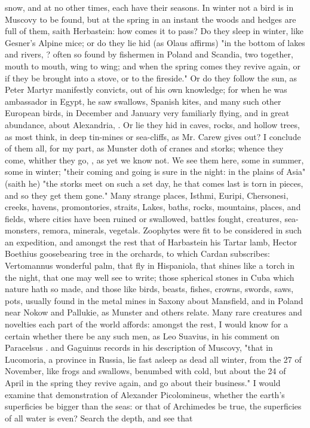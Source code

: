 {snow, and at no other times, each have their seasons. In winter not a bird is in Muscovy to be found, but at the spring in an instant the woods and hedges are full of them, saith Herbastein: how comes it to pass? Do they sleep in winter, like Gesner's Alpine mice; or do they lie hid (as Olaus affirms) "in the bottom of lakes and rivers, ? often so found by fishermen in Poland and Scandia, two together, mouth to mouth, wing to wing; and when the spring comes they revive again, or if they be brought into a stove, or to the fireside." Or do they follow the sun, as Peter Martyr  manifestly convicts, out of his own knowledge; for when he was ambassador in Egypt, he saw swallows, Spanish kites, and many such other European birds, in December and January very familiarly flying, and in great abundance, about Alexandria, . Or lie they hid in caves, rocks, and hollow trees, as most think, in deep tin-mines or sea-cliffs, as Mr. Carew gives out? I conclude of them all, for my part, as Munster doth of cranes and storks; whence they come, whither they go, , as yet we know not. We see them here, some in summer, some in winter; "their coming and going is sure in the night: in the plains of Asia" (saith he) "the storks meet on such a set day, he that comes last is torn in pieces, and so they get them gone." Many strange places, Isthmi, Euripi, Chersonesi, creeks, havens, promontories, straits, Lakes, baths, rocks, mountains, places, and fields, where cities have been ruined or swallowed, battles fought, creatures, sea-monsters, remora, \etc{} minerals, vegetals. Zoophytes were fit to be considered in such an expedition, and amongst the rest that of Harbastein his Tartar lamb, Hector Boethius goosebearing tree in the orchards, to which Cardan  subscribes: Vertomannus wonderful palm, that fly in Hispaniola, that shines like a torch in the night, that one may well see to write; those spherical stones in Cuba which nature hath so made, and those like birds, beasts, fishes, crowns, swords, saws, pots, \etc{} usually found in the metal mines in Saxony about Mansfield, and in Poland near Nokow and Pallukie, as Munster and others relate. Many rare creatures and novelties each part of the world affords: amongst the rest, I would know for a certain whether there be any such men, as Leo Suavius, in his comment on Paracelsus . and Gaguinus records in his description of Muscovy, "that in Lucomoria, a province in Russia, lie fast asleep as dead all winter, from the 27 of November, like frogs and swallows, benumbed with cold, but about the 24 of April in the spring they revive again, and go about their business." I would examine that demonstration of Alexander Picolomineus, whether the earth's superficies be bigger than the seas: or that of Archimedes be true, the superficies of all water is even? Search the depth, and see that }
